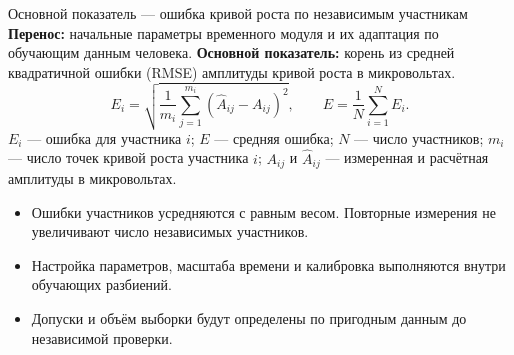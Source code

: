 \begin{frame}{Основной показатель --- ошибка кривой роста по независимым участникам}
\textbf{Перенос:} начальные параметры временного модуля и их адаптация по обучающим данным человека.
\SlideGap
\textbf{Основной показатель:} корень из средней квадратичной ошибки (RMSE) амплитуды кривой роста в микровольтах.
\[
 E_i=\sqrt{\frac{1}{m_i}\sum_{j=1}^{m_i}(\widehat A_{ij}-A_{ij})^2},
 \qquad E=\frac{1}{N}\sum_{i=1}^{N}E_i.
\]
\noindent $E_i$ --- ошибка для участника $i$; $E$ --- средняя ошибка; $N$ --- число участников; $m_i$ --- число точек кривой роста участника $i$; $A_{ij}$ и $\widehat A_{ij}$ --- измеренная и расчётная амплитуды в микровольтах.
\SlideGap
\begin{itemize}
\item Ошибки участников усредняются с равным весом. Повторные измерения не увеличивают число независимых участников.
\item Настройка параметров, масштаба времени и калибровка выполняются внутри обучающих разбиений.
\item Допуски и объём выборки будут определены по пригодным данным до независимой проверки.
\end{itemize}
\end{frame}
